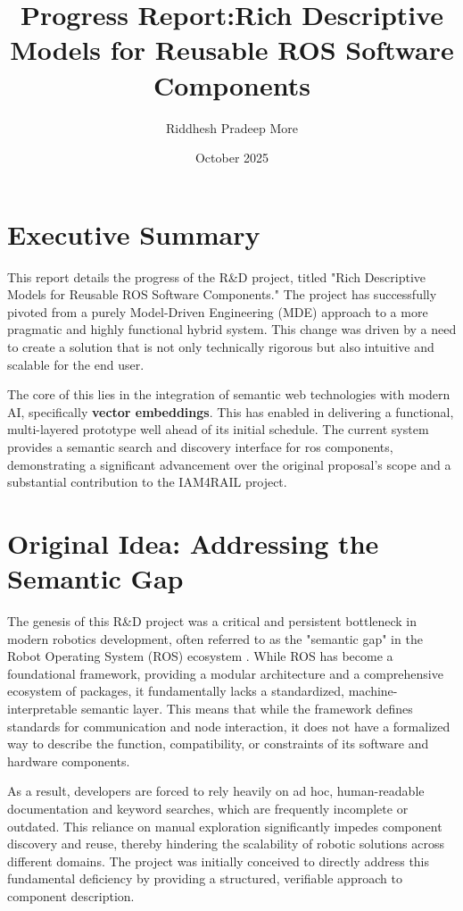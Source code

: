 \documentclass[rnd]{mas_proposal}
\title{Progress Report:Rich Descriptive Models for Reusable ROS Software Components}
\author{Riddhesh Pradeep More}
\date{October 2025}
\begin{document}
\maketitle
\pagestyle{plain}

\section{Executive Summary}
This report details the progress of the R\&D project, titled "Rich Descriptive Models for Reusable ROS Software Components." The project has successfully pivoted from a purely Model-Driven Engineering (MDE) approach to a more pragmatic and highly functional hybrid system. This change was driven by a need to create a solution that is not only technically rigorous but also intuitive and scalable for the end user.

The core of this lies in the integration of semantic web technologies with modern AI, specifically \textbf{vector embeddings}. This has enabled in delivering a functional, multi-layered prototype well ahead of its initial schedule. The current system provides a semantic search and discovery interface for ros components, demonstrating a significant advancement over the original proposal's scope and a substantial contribution to the IAM4RAIL project.

\section{Original Idea: Addressing the Semantic Gap}
The genesis of this R&D project was a critical and persistent bottleneck in modern robotics development, often referred to as the "semantic gap" in the Robot Operating System (ROS) ecosystem \citep{quigley2009ros}. While ROS has become a foundational framework, providing a modular architecture and a comprehensive ecosystem of packages, it fundamentally lacks a standardized, machine-interpretable semantic layer. This means that while the framework defines standards for communication and node interaction, it does not have a formalized way to describe the function, compatibility, or constraints of its software and hardware components.

As a result, developers are forced to rely heavily on ad hoc, human-readable documentation and keyword searches, which are frequently incomplete or outdated. This reliance on manual exploration significantly impedes component discovery and reuse, thereby hindering the scalability of robotic solutions across different domains. The project was initially conceived to directly address this fundamental deficiency by providing a structured, verifiable approach to component description.
\end{document}

